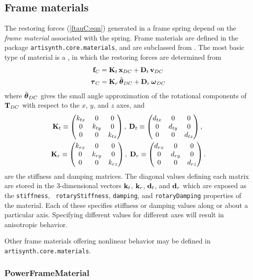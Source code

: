 \subsection{Frame materials}

The restoring forces (\ref{ftauC:eqn}) generated in a frame spring
depend on the {\it frame material} associated with the spring. Frame
materials are defined in the package {\tt artisynth.core.materials},
and are subclassed from
.
The most basic type of material is a 
,
in which the restoring forces are determined from
%
\begin{align*}
{\bf f}_C & = 
{\bf K}_{t} \, {\bf x}_{DC} + {\bf D}_{t} \, {\bf v}_{DC} \\
\boldsymbol\tau_C & = 
{\bf K}_{r} \, \hat{\boldsymbol\theta}_{DC} + {\bf D}_{r} \, \boldsymbol\omega_{DC}
\label{flinear:eqn}
\end{align*}
%
where $\hat{\boldsymbol\theta}_{DC}$ gives the small angle approximation of the
rotational components of ${\bf T}_{DC}$ with respect to the $x$, $y$, and
$z$ axes, and
%
\begin{gather*}
{\bf K}_{t} \equiv 
\left(\begin{matrix} k_{tx} & 0 & 0 \\ 0 & k_{ty} & 0 \\ 0 & 0 & k_{tz} \end{matrix}\right), \;
{\bf D}_{t} \equiv 
\left(\begin{matrix} d_{tx} & 0 & 0 \\ 0 & d_{ty} & 0 \\ 0 & 0 & d_{tz} \end{matrix}\right), \;\\
{\bf K}_{r} \equiv
\left(\begin{matrix} k_{r x} & 0 & 0 \\ 0 & k_{r y} & 0 \\ 0 & 0 & k_{r z} \end{matrix}\right), \;
{\bf D}_{r} \equiv
\left(\begin{matrix} d_{r x} & 0 & 0 \\ 0 & d_{r y} & 0 \\ 0 & 0 & d_{r z} \end{matrix}\right).
\end{gather*}
%
are the stiffness and damping matrices. The diagonal values defining
each matrix are stored in the 3-dimensional vectors ${\bf k}_t$, ${\bf k}_r$,
${\bf d}_t$, and ${\bf d}_r$ which are exposed as the {\tt stiffness}, {\tt
rotaryStiffness}, {\tt damping}, and {\tt rotaryDamping} properties of
the material. Each of these specifies stiffness or damping values
along or about a particular axis. Specifying different values for
different axes will result in anisotropic behavior.

Other frame materials offering nonlinear behavior may be defined in
{\tt artisynth.core.materials}.

\subsubsection{PowerFrameMaterial}
\label{PowerFrameMaterial:sec}


